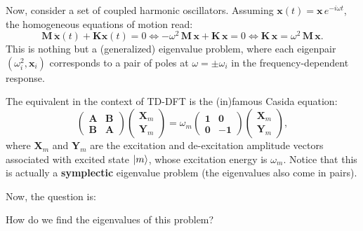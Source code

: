 \documentclass[10pt,aspectratio=169]{beamer}
\begin{document}
\begin{frame}
	Now, consider a set of coupled harmonic oscillators. Assuming $\mathbf{x}(t) = \mathbf{x}\,e^{-i\omega t}$, the homogeneous equations of motion read:
	\begin{equation*}
		\mathbf{M}\,\ddot{\mathbf{x}}(t) + \mathbf{K}\mathbf{x}(t) = 0 \Leftrightarrow -\omega^2\,\mathbf{M}\,\mathbf{x} + \mathbf{K}\,\mathbf{x} = 0 \Leftrightarrow \mathbf{K}\,\mathbf{x} = \omega^2\,\mathbf{M}\,\mathbf{x}.
	\end{equation*}
	This is nothing but a (generalized) eigenvalue problem, where each eigenpair $(\omega_i^2,\mathbf{x}_i)$ corresponds to a pair of poles at $\omega=\pm\omega_i$ in the frequency-dependent response.
	
	\pause
	\medskip
	The equivalent in the context of TD-DFT is the (in)famous Casida equation:
	\begin{equation}
		\begin{pmatrix}
			\mathbf{A} & \mathbf{B} \\
			\mathbf{B} & \mathbf{A}
		\end{pmatrix}
		\begin{pmatrix}
			\mathbf{X}_m \\
			\mathbf{Y}_m
		\end{pmatrix}
		=\omega_m
		\begin{pmatrix}
			\mathbf{1} & \mathbf{0} \\
			\mathbf{0} & -\mathbf{1}
		\end{pmatrix}
		\begin{pmatrix}
			\mathbf{X}_m \\
			\mathbf{Y}_m
		\end{pmatrix},
		\label{eq:casida}
	\end{equation}
	where $\mathbf{X}_m$ and $\mathbf{Y}_m$ are the excitation and de-excitation amplitude vectors associated with excited state $\ket{m}$, whose excitation energy is $\omega_m$.
	Notice that this is actually a \textbf{symplectic} eigenvalue problem (the eigenvalues also come in pairs).
	
	\medskip
	Now, the question is:
	\begin{center}
		\Large How do we find the eigenvalues of this problem?
	\end{center}
\end{frame}
\end{document}
